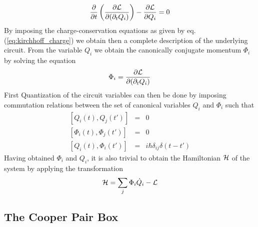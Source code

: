 %
\begin{equation}
\frac{\partial}{\partial t}\left( \frac{\partial \begin{mathcal}L\end{mathcal}}{\partial(\partial_t Q_i)}\right)-\frac{\partial \begin{mathcal}L\end{mathcal}}{\partial Q_i} = 0
\end{equation}
%
By imposing the charge-conservation equations as given by eq. (\ref{eq:kirchhoff_charge}) we obtain then a complete description of the underlying circuit. From the variable $Q_i$ we obtain the canonically conjugate momentum $\Phi_i$ by solving the equation
%
\begin{equation}
\Phi_i = \frac{\partial \begin{mathcal}L\end{mathcal}}{\partial(\partial_t Q_i)}
\end{equation}
%
First Quantization of the circuit variables can then be done by imposing commutation relations between the set of canonical variables $Q_i$ and $\Phi_i$ such that
%
\begin{eqnarray}
\left[Q_i(t),Q_j(t')\right] & = & 0 \\
\left[\Phi_i(t),\Phi_j(t') \right] & = & 0 \\
\left[Q_i(t),\Phi_i(t')\right] & = & i\hbar\delta_{ij}\delta(t-t') \label{eq:quantization_commutation_relations}
\end{eqnarray}
%
Having obtained $\Phi_i$ and $Q_i$, it is also trivial to obtain the Hamiltonian $\begin{mathcal}H\end{mathcal}$ of the system by applying the transformation
%
\begin{equation}
\begin{mathcal}H\end{mathcal} = \sum\limits_j \Phi_i \dot{Q}_i - \begin{mathcal}L\end{mathcal}
\end{equation}
%
\subsection{The Cooper Pair Box}

